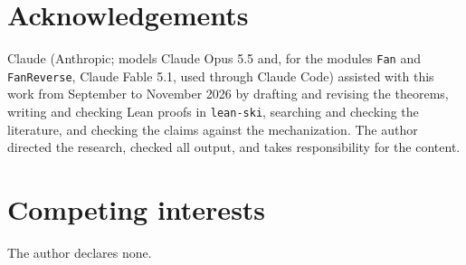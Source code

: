 \documentclass[acmsmall,review,screen]{acmart}\def\acmclass{}
\theoremstyle{plain}
\theoremstyle{definition}
\theoremstyle{remark}
\begin{document}
\section*{Acknowledgements}
Claude (Anthropic; models Claude Opus 5.5 and, for the modules \texttt{Fan} and
\texttt{FanReverse}, Claude Fable 5.1, used through Claude Code) assisted with this
work from September to November 2026 by drafting and revising the theorems, writing and checking Lean proofs
in \texttt{lean-ski}, searching and checking the literature, and checking the
claims against the mechanization.  The author directed the research, checked all
output, and takes responsibility for the content.

\section*{Competing interests}
The author declares none.

\ifdefined\acmclass\else\ifdefined\mscclass\else\fi\fi

\end{document}
